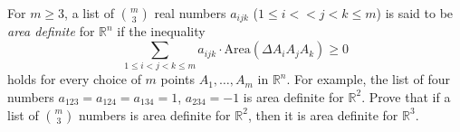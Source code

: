 For $m \geq 3$, a list of $\binom{m}{3}$ real numbers $a_{ijk}$ ($1 \leq i < < j < k \leq m$) is said to be \emph{area definite} for $\mathbb{R}^n$ if the inequality
\[
\sum_{1 \leq i < j < k \leq m} a_{ijk} \cdot \mathrm{Area}(\Delta A_i A_j A_k) \geq 0
\]
holds for every choice of $m$ points $A_1,\dots,A_m$ in $\mathbb{R}^n$.
For example, the list of four numbers $a_{123} = a_{124} = a_{134} = 1$, $a_{234} = -1$ is area definite for $\mathbb{R}^2$. Prove that if a list of $\binom{m}{3}$ numbers is area definite for $\mathbb{R}^2$,
then it is area definite for $\mathbb{R}^3$.

